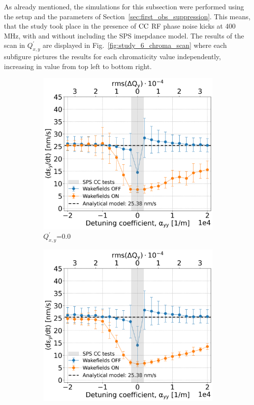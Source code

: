 As already mentioned, the simulations for this subsection were performed using the setup and the parameters of Section~\ref{sec:first_obs_suppression}. This means, that the study took place in the presence of ${\mathrm{CC}}$ RF phase noise kicks at 400\,MHz, with and without including the SPS imepdance model. The results of the scan in $Q^\prime_{x,y}$ are displayed in Fig.~\ref{fig:study_6_chroma_scan} where each subfigure pictures the results for each chromaticity value independently, increasing in value from top left to bottom right. 
\begin{figure}[htp]
    \centering
    \begin{subfigure}{.45\textwidth}
        \centering
        \includegraphics[width=.95\linewidth]{images/Ch7/Qpx0.png}  
        \caption{$Q^\prime_{x,y}$=0.0}
        \label{fig:study_6_chroma_scan_Qpxy0}
    \end{subfigure}
    \begin{subfigure}{.45\textwidth}
        \centering
        \includegraphics[width=.95\linewidth]{images/Ch7/deyRates_final_2018_PN_sps_270GeV_PN1e-8_400MHz_y-plane_QpxQpy5e-1_6D_Nb5e5_intensity3e10_ayyScan_wakesON_vs_OFF_vs_TuneSpreadvsExpectedSPS.png}

\end{subfigure}
\end{figure}
